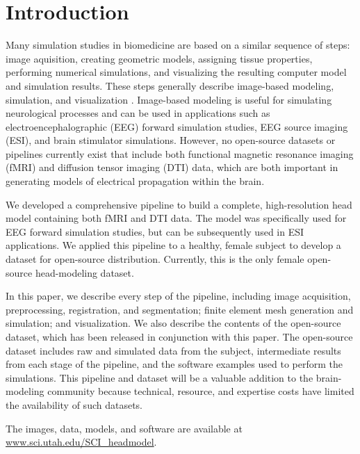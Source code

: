 
\section{Introduction}
\label{sec:intro}

Many simulation studies in biomedicine are based on a similar sequence of steps: image aquisition, creating geometric models, assigning tissue properties, performing numerical simulations, and visualizing the resulting computer model and simulation results. These steps generally describe image-based modeling, simulation, and visualization \cite{SCI:Mac2009a,SCI:Joh2015c,SCI:Joh2012a,SCI:Joh2006a,SCI:Joh2004b}. Image-based modeling is useful for simulating neurological processes and can be used in applications such as electroencephalographic (EEG) forward simulation studies, EEG source imaging (ESI), and brain stimulator simulations. However, no open-source datasets or pipelines currently exist that include both functional magnetic resonance imaging (fMRI) and diffusion tensor imaging (DTI) data, which are both important in generating models of electrical propagation within the brain. 

We developed a comprehensive pipeline to build a complete, high-resolution head model containing both fMRI and DTI data. The model was specifically used for EEG forward simulation studies, but can be subsequently used in ESI applications. We applied this pipeline to a healthy, female subject to develop a dataset for open-source distribution. Currently, this is the only female open-source head-modeling dataset.

In this paper, we describe every step of the pipeline, including image acquisition, preprocessing, registration, and segmentation; finite element mesh generation and simulation; and visualization. We also describe the contents of the open-source dataset, which has been released in conjunction with this paper. The open-source dataset includes raw and simulated data from the subject, intermediate results from each stage of the pipeline, and the software examples used to perform the simulations. This pipeline and dataset will be a valuable addition to the brain-modeling community because technical, resource, and expertise costs have limited the availability of such datasets. 

The images, data, models, and software are available at \url{www.sci.utah.edu/SCI_headmodel}.